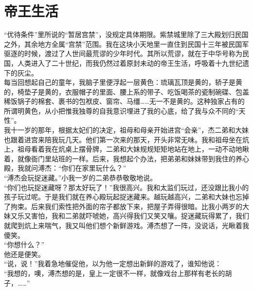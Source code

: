 \fancyhead[RO]{} %
\fancyhead[LE]{} %
\chapter*{帝王生活}
\thispagestyle{empty}
“优待条件”里所说的“暂居宫禁”，没规定具体期限。紫禁城里除了三大殿划归民国之外，其余地方全属“宫禁”范围。我在这块小天地里一直住到民国十三年被民国军驱逐的时候，渡过了人世间最荒谬的少年时代。其所以荒谬，就在于中华号称为民国，人类进入了二十世纪，而我仍然过着原封未动的帝王生活，呼吸着十九世纪遗下的灰尘。\\

每当回想起自己的童年，我脑子里便浮起一层黄色：琉璃瓦顶是黄的，轿子是黄的，椅垫子是黄的，衣服帽子的里面、腰上系的带子、吃饭喝茶的瓷制碗碟、包盖稀饭锅子的棉套、裹书的包袱皮、窗帘、马缰……无一不是黄的。这种独家占有的所谓明黄色，从小把惟我独尊的自我意识埋进了我的心底，给了我与众不同的“天性”。\\

我十一岁的那年，根据太妃们的决定，祖母和母亲开始进宫“会亲”，杰二弟和大妹也跟着进宫来陪我玩几天。他们第一次来的那天，开头非常无味。我和祖母坐在炕上，祖母看着我在炕桌上摆骨牌，二弟和大妹规规矩矩地站在地上，一动不动地瞅着，就像衙门里站班的一样。后来，我想起个办法，把弟弟和妹妹带到我住的养心殿，我就问溥杰：“你们在家里玩什么？”\\

“溥杰会玩捉迷藏。”小我一岁的二弟恭恭敬敬地说。\\

“你们也玩捉迷藏呀？那太好玩了！”我很高兴。我和太监们玩过，还没跟比我小的孩子玩过呢。于是我们就在养心殿玩起捉迷藏来。越玩越高兴，二弟和大妹也忘掉了拘束。后来我们索性把外面的帘子都放下来，把屋子弄得很暗。比我小两岁的大妹又乐又害怕，我和二弟就吓唬她，高兴得我们又笑又嚷。捉迷藏玩得累了，我们就爬到炕上来喘气，我又叫他们想个新鲜游戏。溥杰想了一阵，没说话，光瞅着我傻笑。\\

“你想什么？”\\

他还是便笑。\\

“说，说！”我着急地催促他，以为他一定想出新鲜的游戏了，谁知他说：\\

“我想的，噢，溥杰想的是，皇上一定很不一样，就像戏台上那样有老长的胡子，……”\\

